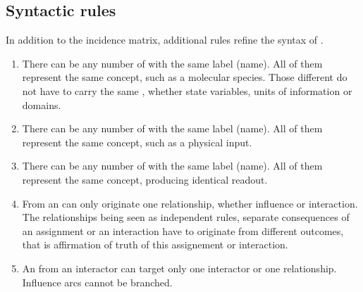 
\subsection{Syntactic rules}

In addition to the incidence matrix, additional rules refine the syntax of \ERs.


\begin{enumerate}
\item There can be any number of  with the same label (name). All of them represent the same concept, such as a molecular species. Those different  do not have to carry the same , whether state variables, units of information or domains.
\item There can be any number of  with the same label (name). All of them represent the same concept, such as a physical input. 
\item There can be any number of  with the same label (name). All of them represent the same concept, producing identical readout.
\item From an  can only originate one relationship, whether influence or interaction. The relationships being seen as independent rules, separate consequences of an assignment or an interaction have to originate from different outcomes, that is affirmation of truth of this assignement or interaction.
\item An  from an interactor can target only one interactor or one relationship. Influence arcs cannot be branched. 
\end{enumerate}  

\normalcolor